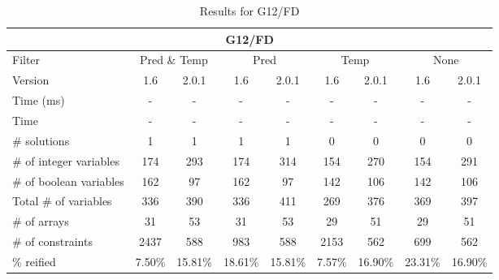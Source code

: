 \documentclass{standalone}
\begin{document}
\begin{table}[H]
\footnotesize
\centering
\begin{tabular}{lc|c|c|c|c|c|c|c}
\multicolumn{9}{c}{G12/FD} \\ 
\hline\hline Filter & \multicolumn{2}{c|}{Pred \& Temp} &\multicolumn{2}{c|}{Pred}  & \multicolumn{2}{c|}{Temp} & \multicolumn{2}{c}{None} \\ 
\hline Version & 1.6 & 2.0.1 & 1.6 & 2.0.1 & 1.6 & 2.0.1 & 1.6 & 2.0.1 \\ 
Time (ms)               & - & - & - & - & - & - & - & - \\
Time                    & - & - & - & - & - & - & - & - \\ 
\# solutions			& 1 & 1 & 1 & 1 & 0 & 0 & 0 & 0 \\
\# of integer variables & 174 & 293 & 174 & 314 & 154 & 270 & 154 & 291 \\ 
\# of boolean variables & 162 & 97 & 162 & 97 & 142 & 106 & 142 & 106 \\ 
Total \# of variables   & 336 & 390 & 336 & 411 & 269 & 376 & 369 & 397 \\ 
\# of arrays            & 31 & 53 & 31 & 53 & 29 & 51 & 29 & 51 \\ 
\# of constraints       & 2437 & 588 & 983 & 588 & 2153 & 562 & 699 & 562 \\ 
\% reified               & 7.50\% & 15.81\% & 18.61\% & 15.81\% & 7.57\% & 16.90\% &23.31\% & 16.90\% \\ 
\end{tabular}
\caption{Results for G12/FD}\label{tab:res_g12}
\end{table} 
\end{document}
